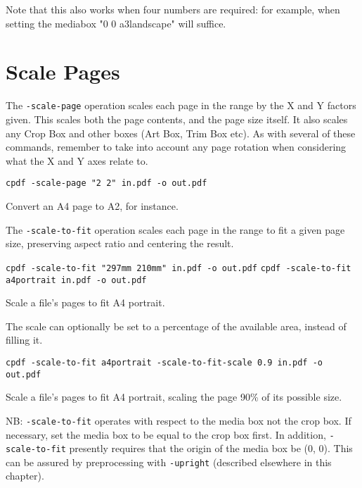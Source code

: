 \documentclass{book}
\begin{document}
Note that this also works when four numbers are required: for example, when setting the mediabox "0 0 a3landscape" will suffice.

  \section{Scale Pages}
  The \texttt{-scale-page} operation scales each page in the range by the X and
Y factors given. This scales both the page contents, and the page size itself. It also scales any Crop Box and other boxes (Art Box, Trim Box etc). As with several of these commands, remember to take into account any page rotation when considering what the X and Y axes relate to.

  \begin{framed}
  \small\noindent\verb!cpdf -scale-page "2 2" in.pdf -o out.pdf!

  \vspace{2.5mm}
  \noindent Convert an A4 page to A2, for instance.
  \end{framed}

  \noindent The \texttt{-scale-to-fit} operation scales each page in the range to fit a
  given page size, preserving aspect ratio and centering the result.

  \begin{framed}
  \small\noindent\verb!cpdf -scale-to-fit "297mm 210mm" in.pdf -o out.pdf!
  \small\noindent\verb!cpdf -scale-to-fit a4portrait in.pdf -o out.pdf!

  \vspace{2.5mm}
  \noindent Scale a file's pages to fit A4 portrait.
  \end{framed}

  \noindent The scale can optionally be set to a percentage of the available area, instead of filling it.
  \begin{framed}
  \small\noindent\verb!cpdf -scale-to-fit a4portrait -scale-to-fit-scale 0.9 in.pdf -o out.pdf!


  \vspace{2.5mm}
  \noindent Scale a file's pages to fit A4 portrait, scaling the page 90\% of its possible size.
  \end{framed}

\noindent NB: \texttt{-scale-to-fit} operates with respect to the media box not the crop box. If necessary, set the media box to be equal to the crop box first. In addition, \texttt{-scale-to-fit} presently requires that the origin of the media box be (0, 0). This can be assured by preprocessing with \texttt{-upright} (described elsewhere in this chapter).
\end{document}
